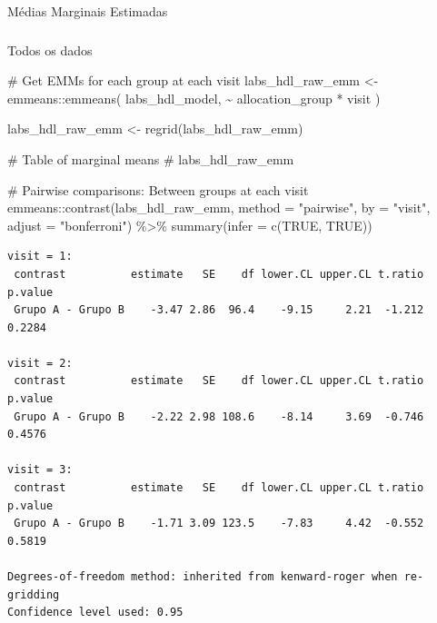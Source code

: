 \documentclass[
  12pt,
]{article}
\makeatletter
\let\oldparagraph\paragraph
\renewcommand{\paragraph}{
    \@ifstar
      \xxxParagraphStar
      \xxxParagraphNoStar
  }
\newcommand{\xxxParagraphStar}[1]{\oldparagraph*{#1}\mbox{}}
\newcommand{\xxxParagraphNoStar}[1]{\oldparagraph{#1}\mbox{}}
\let\oldsubparagraph\subparagraph
\renewcommand{\subparagraph}{
    \@ifstar
      \xxxSubParagraphStar
      \xxxSubParagraphNoStar
  }
\newcommand{\xxxSubParagraphStar}[1]{\oldsubparagraph*{#1}\mbox{}}
\newcommand{\xxxSubParagraphNoStar}[1]{\oldsubparagraph{#1}\mbox{}}
\newenvironment{Shaded}{\begin{snugshade}}{\end{snugshade}}
\newcommand{\AttributeTok}[1]{\textcolor[rgb]{0.40,0.45,0.13}{#1}}
\newcommand{\CommentTok}[1]{\textcolor[rgb]{0.37,0.37,0.37}{#1}}
\newcommand{\ConstantTok}[1]{\textcolor[rgb]{0.56,0.35,0.01}{#1}}
\newcommand{\FunctionTok}[1]{\textcolor[rgb]{0.28,0.35,0.67}{#1}}
\newcommand{\NormalTok}[1]{\textcolor[rgb]{0.00,0.23,0.31}{#1}}
\newcommand{\OtherTok}[1]{\textcolor[rgb]{0.00,0.23,0.31}{#1}}
\newcommand{\SpecialCharTok}[1]{\textcolor[rgb]{0.37,0.37,0.37}{#1}}
\newcommand{\StringTok}[1]{\textcolor[rgb]{0.13,0.47,0.30}{#1}}
\makeatother
\begin{document}
\paragraph{Médias Marginais
Estimadas}\label{muxe9dias-marginais-estimadas-6}

\subparagraph{Todos os dados}\label{todos-os-dados-6}

\begin{Shaded}
\begin{Highlighting}[]
\CommentTok{\# Get EMMs for each group at each visit}
\NormalTok{labs\_hdl\_raw\_emm }\OtherTok{\textless{}{-}}\NormalTok{ emmeans}\SpecialCharTok{::}\FunctionTok{emmeans}\NormalTok{(}
\NormalTok{    labs\_hdl\_model, }
    \SpecialCharTok{\textasciitilde{}}\NormalTok{ allocation\_group }\SpecialCharTok{*}\NormalTok{ visit}
\NormalTok{)}

\NormalTok{labs\_hdl\_raw\_emm }\OtherTok{\textless{}{-}} \FunctionTok{regrid}\NormalTok{(labs\_hdl\_raw\_emm)}

\CommentTok{\# Table of marginal means}
\CommentTok{\# labs\_hdl\_raw\_emm}

\CommentTok{\# Pairwise comparisons: Between groups at each visit}
\NormalTok{emmeans}\SpecialCharTok{::}\FunctionTok{contrast}\NormalTok{(labs\_hdl\_raw\_emm,}
\AttributeTok{method =} \StringTok{"pairwise"}\NormalTok{, }\AttributeTok{by =} \StringTok{"visit"}\NormalTok{,}
\AttributeTok{adjust =} \StringTok{"bonferroni"}\NormalTok{) }\SpecialCharTok{\%\textgreater{}\%} \FunctionTok{summary}\NormalTok{(}\AttributeTok{infer =} \FunctionTok{c}\NormalTok{(}\ConstantTok{TRUE}\NormalTok{, }\ConstantTok{TRUE}\NormalTok{))}
\end{Highlighting}
\end{Shaded}

\begin{verbatim}
visit = 1:
 contrast          estimate   SE    df lower.CL upper.CL t.ratio p.value
 Grupo A - Grupo B    -3.47 2.86  96.4    -9.15     2.21  -1.212  0.2284

visit = 2:
 contrast          estimate   SE    df lower.CL upper.CL t.ratio p.value
 Grupo A - Grupo B    -2.22 2.98 108.6    -8.14     3.69  -0.746  0.4576

visit = 3:
 contrast          estimate   SE    df lower.CL upper.CL t.ratio p.value
 Grupo A - Grupo B    -1.71 3.09 123.5    -7.83     4.42  -0.552  0.5819

Degrees-of-freedom method: inherited from kenward-roger when re-gridding 
Confidence level used: 0.95 
\end{verbatim}
\end{document}
